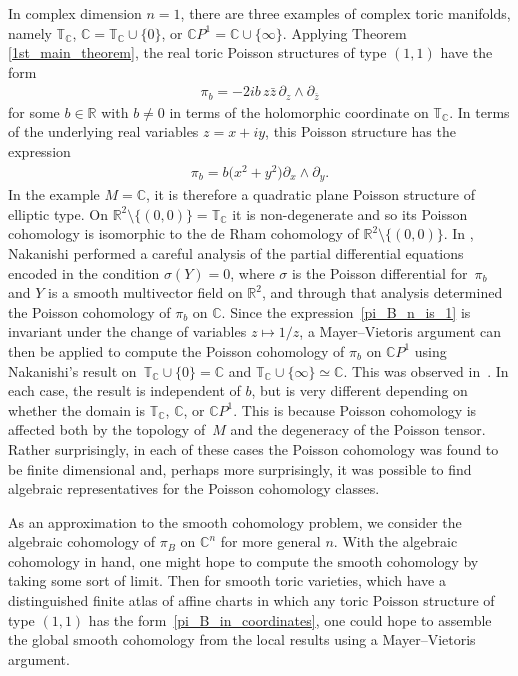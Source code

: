 \documentclass[pdftex]{sigma}
\numberwithin{equation}{section}
\begin{document}
In complex dimension $n=1$, there are three examples of complex toric manifolds, namely ${\mathbb T}_{\mathbb C}$, ${\mathbb C}={\mathbb T}_{\mathbb C}\cup\{0\}$, or ${\mathbb C} P^1={\mathbb C}\cup\{\infty\}$. Applying Theorem \ref{1st_main_theorem}, the real toric Poisson structures of type $(1,1)$ have the form
\begin{gather}\label{pi_B_n_is_1}
\pi_b=-2ib\,z\bar{z}\,\partial_{z}\wedge\partial_{\bar{z}}
\end{gather}
for some $b\in{\mathbb R}$ with $b\not=0$ in terms of the holomorphic coordinate on ${\mathbb T}_{\mathbb C}$. In terms of the underlying real variables $z=x+iy$, this Poisson structure has the expression
\begin{gather*}
\pi_b=b\big(x^2+y^2\big)\partial_x\wedge\partial_y.
\end{gather*}
In the example $M={\mathbb C}$, it is therefore a quadratic plane Poisson structure of elliptic type. On ${\mathbb R}^2\setminus\{(0,0)\}={\mathbb T}_{\mathbb C}$ it is non-degenerate and so its Poisson cohomology is isomorphic to the de Rham cohomology
of ${\mathbb R}^2\setminus\{(0,0)\}$. In \cite{Nakanishi}, Nakanishi performed a careful analysis of the partial dif\/ferential equations encoded in the condition $\sigma(Y)=0$, where $\sigma$ is the Poisson dif\/ferential for~$\pi_b$ and $Y$ is a smooth multivector f\/ield on ${\mathbb R}^2$, and through that analysis determined the Poisson cohomology of $\pi_b$ on ${\mathbb C}$. Since the expression~\eqref{pi_B_n_is_1} is invariant under the change of variables $z\mapsto 1/z$, a Mayer--Vietoris argument can then be applied to compute the Poisson cohomology of $\pi_b$ on ${\mathbb C} P^1$ using Nakanishi's result on~${\mathbb T}_{\mathbb C}\cup\{0\}={\mathbb C}$ and ${\mathbb T}_{\mathbb C}\cup\{\infty\}\simeq {\mathbb C}$. This was observed in~\cite{Caine}. In each case, the result is independent of $b$, but is very dif\/ferent depending on whether the domain is ${\mathbb T}_{\mathbb C}$, ${\mathbb C}$, or ${\mathbb C} P^1$.
This is because Poisson cohomology is af\/fected both by the topology of~$M$ and the degeneracy of the Poisson tensor. Rather surprisingly, in each of these cases the Poisson cohomology was found to be f\/inite dimensional and, perhaps more surprisingly, it was possible to f\/ind algebraic representatives for the Poisson cohomology classes.

As an approximation to the smooth cohomology problem, we consider the algebraic coho\-mology of $\pi_B$ on ${\mathbb C}^n$ for more general $n$. With the algebraic cohomology in hand, one might hope to compute the smooth cohomology by taking some sort of limit. Then for smooth toric varieties, which have a distinguished f\/inite atlas of af\/f\/ine charts in which any toric Poisson structure of type $(1,1)$ has the form~\eqref{pi_B_in_coordinates}, one could hope to assemble the global smooth cohomology from the local results using a Mayer--Vietoris argument.
\end{document}
